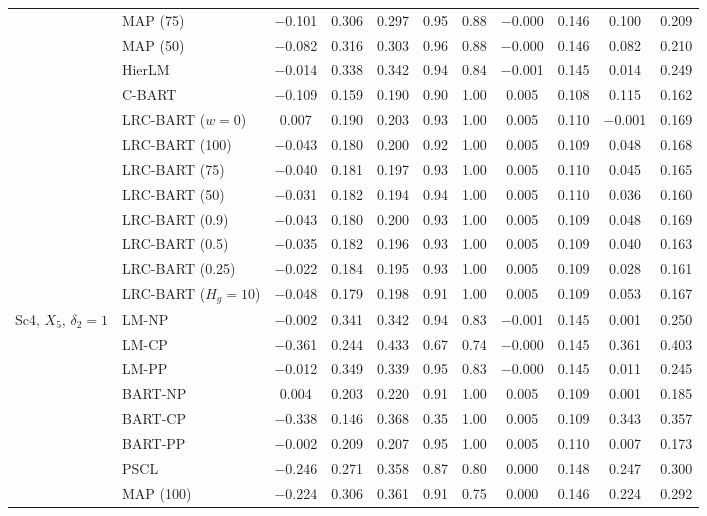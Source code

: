 \documentclass[11pt]{article}
\theoremstyle{definition}
\theoremstyle{plain}
\begin{document}
\begin{center}
\begin{longtable}{llccccccccc}
& MAP (75) & $-$0.101 & 0.306 & 0.297 & 0.95 & 0.88 & $-$0.000 & 0.146 & 0.100 & 0.209 \\
& MAP (50) & $-$0.082 & 0.316 & 0.303 & 0.96 & 0.88 & $-$0.000 & 0.146 & 0.082 & 0.210 \\
& HierLM & $-$0.014 & 0.338 & 0.342 & 0.94 & 0.84 & $-$0.001 & 0.145 & 0.014 & 0.249 \\
& C-BART & $-$0.109 & 0.159 & 0.190 & 0.90 & 1.00 & 0.005 & 0.108 & 0.115 & 0.162 \\
& LRC-BART ($w=0$) & 0.007 & 0.190 & 0.203 & 0.93 & 1.00 & 0.005 & 0.110 & $-$0.001 & 0.169 \\
& LRC-BART (100) & $-$0.043 & 0.180 & 0.200 & 0.92 & 1.00 & 0.005 & 0.109 & 0.048 & 0.168 \\
& LRC-BART (75) & $-$0.040 & 0.181 & 0.197 & 0.93 & 1.00 & 0.005 & 0.110 & 0.045 & 0.165 \\
& LRC-BART (50) & $-$0.031 & 0.182 & 0.194 & 0.94 & 1.00 & 0.005 & 0.110 & 0.036 & 0.160 \\
& LRC-BART (0.9) & $-$0.043 & 0.180 & 0.200 & 0.93 & 1.00 & 0.005 & 0.109 & 0.048 & 0.169 \\
& LRC-BART (0.5) & $-$0.035 & 0.182 & 0.196 & 0.93 & 1.00 & 0.005 & 0.109 & 0.040 & 0.163 \\
& LRC-BART (0.25) & $-$0.022 & 0.184 & 0.195 & 0.93 & 1.00 & 0.005 & 0.109 & 0.028 & 0.161 \\
& LRC-BART ($H_g=10$) & $-$0.048 & 0.179 & 0.198 & 0.91 & 1.00 & 0.005 & 0.109 & 0.053 & 0.167 \\
\midrule
\multirow{20}{*}{Sc4, $X_5$, $\delta_2=1$} & LM-NP & $-$0.002 & 0.341 & 0.342 & 0.94 & 0.83 & $-$0.001 & 0.145 & 0.001 & 0.250 \\
& LM-CP & $-$0.361 & 0.244 & 0.433 & 0.67 & 0.74 & $-$0.000 & 0.145 & 0.361 & 0.403 \\
& LM-PP & $-$0.012 & 0.349 & 0.339 & 0.95 & 0.83 & $-$0.000 & 0.145 & 0.011 & 0.245 \\
& BART-NP & 0.004 & 0.203 & 0.220 & 0.91 & 1.00 & 0.005 & 0.109 & 0.001 & 0.185 \\
& BART-CP & $-$0.338 & 0.146 & 0.368 & 0.35 & 1.00 & 0.005 & 0.109 & 0.343 & 0.357 \\
& BART-PP & $-$0.002 & 0.209 & 0.207 & 0.95 & 1.00 & 0.005 & 0.110 & 0.007 & 0.173 \\
& PSCL & $-$0.246 & 0.271 & 0.358 & 0.87 & 0.80 & 0.000 & 0.148 & 0.247 & 0.300 \\
& MAP (100) & $-$0.224 & 0.306 & 0.361 & 0.91 & 0.75 & 0.000 & 0.146 & 0.224 & 0.292 \\

\end{longtable}
\end{center}
\end{document}
